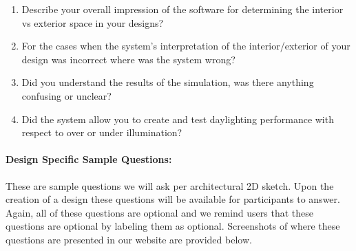 \documentclass[12pt]{article}
\begin{document}
\begin{enumerate}
    \item Describe your overall impression of the software for determining the interior vs exterior space in your designs?
    \item For the cases when the system’s interpretation of the interior/exterior of your design was incorrect where was the system wrong? 
    \item Did you understand the results of the simulation, was there anything confusing or unclear?
    \item Did the system allow you to create and test daylighting performance with respect to over or under illumination?

      \end{enumerate}

\newpage

\paragraph{Design Specific Sample Questions:}
These are sample questions we will ask per architectural  2D sketch.
Upon the creation of a design these questions will be available for participants to answer.
Again, all of these questions are optional and we remind users that these questions are optional by labeling them as optional. Screenshots of where these questions are presented in our website are provided below.
\end{document}
